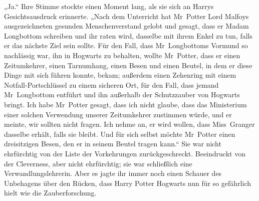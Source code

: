 „Ja.“ Ihre Stimme stockte einen Moment lang, als sie sich an Harrys Gesichtsausdruck erinnerte.
„Nach dem Unterricht hat Mr~Potter Lord Malfoys ausgezeichneten gesunden Menschenverstand gelobt und gesagt, dass er Madam Longbottom schreiben und ihr raten wird, dasselbe mit ihrem Enkel zu tun, falls er das nächste Ziel sein sollte. Für den Fall, dass Mr~Longbottoms Vormund so nachlässig war, ihn in Hogwarts zu behalten, wollte Mr~Potter, dass er einen Zeitumkehrer, einen Tarnumhang, einen Besen und einen Beutel, in dem er diese Dinge mit sich führen konnte, bekam; außerdem einen Zehenring mit einem Notfall-Portschlüssel zu einem sicheren Ort, für den Fall, dass jemand Mr~Longbottom entführt und ihn außerhalb der Schutzzauber von Hogwarts bringt. Ich habe Mr~Potter gesagt, dass ich nicht glaube, dass das Ministerium einer solchen Verwendung unserer Zeitumkehrer zustimmen würde, und er meinte, wir sollten nicht fragen. Ich nehme an, er wird wollen, dass Miss~Granger dasselbe erhält, falls sie bleibt. Und für sich selbst möchte Mr~Potter einen dreisitzigen Besen, den er in seinem Beutel tragen kann.“
Sie war nicht ehrfürchtig von der Liste der Vorkehrungen zurückgeschreckt. Beeindruckt von der Cleverness, aber nicht ehrfürchtig; sie war schließlich eine Verwandlungslehrerin. Aber es jagte ihr immer noch einen Schauer des Unbehagens über den Rücken, dass Harry Potter Hogwarts nun für so gefährlich hielt wie die Zauberforschung.

